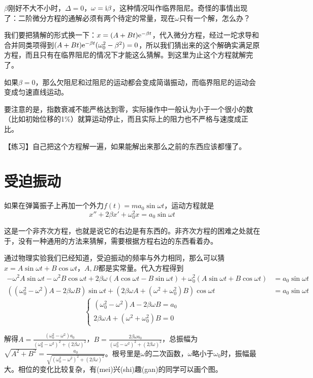 $\beta$刚好不大不小时，$\Delta=0$，$\omega=\mathrm{i} \beta$，这种情况叫作临界阻尼。奇怪的事情出现了：二阶微分方程的通解必须有两个待定的常量，现在$\omega$只有一个解，怎么办？

我们要把猜解的形式换一下：$x=(A+B t)\mathrm{e}^{-\beta t}$，代入微分方程，经过一坨求导和合并同类项得到$(A+B t)\mathrm{e}^{-\beta t} (\omega_0^2-\beta^2)=0$，所以我们猜出来的这个解确实满足原方程，而且只有在临界阻尼的情况下才能这么猜解。到这里为止这个方程就解完了。

如果$\beta=0$，那么欠阻尼和过阻尼的运动都会变成简谐振动，而临界阻尼的运动会变成匀速直线运动。

要注意的是，指数衰减不能严格达到零，实际操作中一般认为小于一个很小的数（比如初始位移的1\%）就算运动停止，而且实际上的阻力也不严格与速度成正比。

【练习】自己把这个方程解一遍，如果能解出来那么之前的东西应该都懂了。
\section{受迫振动}
如果在弹簧振子上再加一个外力$f(t)=m a_0 \sin \omega t$，运动方程就是
\begin{equation*}
x''+2 \beta x'+\omega_0^2 x=a_0 \sin \omega t
\end{equation*}

这是一个非齐次方程，也就是说它的右边是有东西的。非齐次方程的困难之处就在于，没有一种通用的方法来猜解，需要根据方程右边的东西看着办。

通过物理实验我们已经知道，受迫振动的频率与外力相同，那么可以猜$x=A \sin \omega t+B \cos \omega t$，$A,B$都是实常量。代入方程得到
\begin{align*}
-\omega^2 A \sin \omega t-\omega^2 B \cos \omega t+2 \beta \omega (A \cos \omega t-B \sin \omega t)+\omega_0^2 (A \sin \omega t+B \cos \omega t)&=a_0 \sin \omega t \\
((\omega_0^2-\omega ^2)A-2 \beta \omega B)\sin \omega t +(2 \beta \omega A+(\omega ^2+\omega_0^2)B)\cos \omega t&=a_0 \sin \omega t
\end{align*}
\begin{equation*}
\begin{cases}
(\omega_0^2-\omega ^2)A-2 \beta \omega B=a_0 \\
2 \beta \omega A+(\omega ^2+\omega_0^2)B=0
\end{cases}
\end{equation*}

解得$A=\frac{(\omega_0^2-\omega ^2) a_0}{(\omega_0^2-\omega ^2)^2+(2 \beta \omega)^2}$，$B=\frac{2 \beta \omega a_0}{(\omega_0^2-\omega ^2)^2+(2 \beta \omega)^2}$，总振幅为$\sqrt{A^2+B^2}=\frac{a_0}{\sqrt{(\omega_0^2-\omega ^2)^2+(2 \beta \omega)^2}}$。根号里是$\omega$的二次函数，$\omega$略小于$\omega_0$时，振幅最大。相位的变化比较复杂，有(mei)兴(shi)趣(gan)的同学可以画个图。

